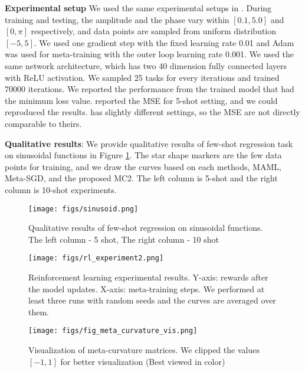 \documentclass{article}
\begin{document}
\textbf{Experimental setup}
We used the same experimental setups in \cite{Finn-icml-2017}. During training and testing, the amplitude and the phase vary within $[0.1, 5.0]$ and $[0,\pi]$ respectively, and data points are sampled from uniform distribution $[-5,5]$. We used one gradient step with the fixed learning rate 0.01 and Adam was used for meta-training with the outer loop learning rate 0.001. We used the same network architecture, which has two 40 dimension fully connected layers with ReLU activation. We sampled 25 tasks for every iterations and trained 70000 iterations. We reported the performance from the trained model that had the minimum loss value. \cite{Finn-icml-2017} reported the MSE for 5-shot setting, and we could reproduced the results. \cite{Li-arxiv-2017} has slightly different settings, so the MSE are not directly comparable to theirs.

\textbf{Qualitative results}: We provide qualitative results of few-shot regression task on sinusoidal functions in Figure \ref{fig:sinosoid}. The star shape markers are the few data points for training, and we draw the curves based on each methods, MAML, Meta-SGD, and the proposed MC2. The left column is 5-shot and the right column is 10-shot experiments.

\begin{figure}[t]
\begin{center}
\centerline{\texttt{[image: figs/sinusoid.png]}}
\caption{Qualitative results of few-shot regression on sinusoidal functions. The left column - 5 shot, The right column - 10 shot}
\label{fig:sinosoid}
\end{center}
\end{figure}

\begin{figure*}[t]
\begin{center}
\centerline{\texttt{[image: figs/rl\_experiment2.png]}}
\caption{Reinforcement learning experimental results. Y-axis: rewards after the model updates. X-axis: meta-training steps. We performed at least three runs with random seeds and the curves are averaged over them.}
\label{fig:rl_experiment}
\end{center}
\end{figure*}

\begin{figure}[t]
\begin{center}
\centerline{\texttt{[image: figs/fig\_meta\_curvature\_vis.png]}}
\caption{Visualization of meta-curvature matrices. We clipped the values $[-1,1]$ for better visualization (Best viewed in color)}
\label{fig:meta_curvature_vis}
\end{center}
\end{figure}
\end{document}
